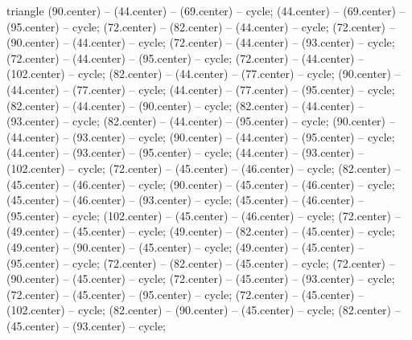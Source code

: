 \begin{pgfonlayer}{triangle}
 (90.center) -- (44.center) -- (69.center) -- cycle; 
 (44.center) -- (69.center) -- (95.center) -- cycle; 
 (72.center) -- (82.center) -- (44.center) -- cycle; 
 (72.center) -- (90.center) -- (44.center) -- cycle; 
 (72.center) -- (44.center) -- (93.center) -- cycle; 
 (72.center) -- (44.center) -- (95.center) -- cycle; 
 (72.center) -- (44.center) -- (102.center) -- cycle; 
 (82.center) -- (44.center) -- (77.center) -- cycle; 
 (90.center) -- (44.center) -- (77.center) -- cycle; 
 (44.center) -- (77.center) -- (95.center) -- cycle; 
 (82.center) -- (44.center) -- (90.center) -- cycle; 
 (82.center) -- (44.center) -- (93.center) -- cycle; 
 (82.center) -- (44.center) -- (95.center) -- cycle; 
 (90.center) -- (44.center) -- (93.center) -- cycle; 
 (90.center) -- (44.center) -- (95.center) -- cycle; 
 (44.center) -- (93.center) -- (95.center) -- cycle; 
 (44.center) -- (93.center) -- (102.center) -- cycle; 
 (72.center) -- (45.center) -- (46.center) -- cycle; 
 (82.center) -- (45.center) -- (46.center) -- cycle; 
 (90.center) -- (45.center) -- (46.center) -- cycle; 
 (45.center) -- (46.center) -- (93.center) -- cycle; 
 (45.center) -- (46.center) -- (95.center) -- cycle; 
 (102.center) -- (45.center) -- (46.center) -- cycle; 
 (72.center) -- (49.center) -- (45.center) -- cycle; 
 (49.center) -- (82.center) -- (45.center) -- cycle; 
 (49.center) -- (90.center) -- (45.center) -- cycle; 
 (49.center) -- (45.center) -- (95.center) -- cycle; 
 (72.center) -- (82.center) -- (45.center) -- cycle; 
 (72.center) -- (90.center) -- (45.center) -- cycle; 
 (72.center) -- (45.center) -- (93.center) -- cycle; 
 (72.center) -- (45.center) -- (95.center) -- cycle; 
 (72.center) -- (45.center) -- (102.center) -- cycle; 
 (82.center) -- (90.center) -- (45.center) -- cycle; 
 (82.center) -- (45.center) -- (93.center) -- cycle; 

\end{pgfonlayer}
